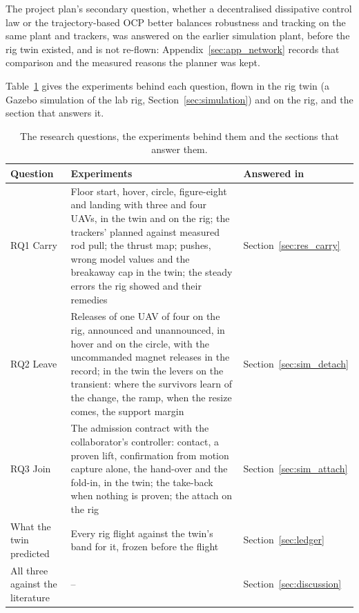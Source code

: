 The project plan's secondary question, whether a decentralised dissipative control law \cite{quan2025swarm} or
the trajectory-based OCP \cite{tudelft} better balances robustness and tracking on the same plant and
trackers, was answered on the earlier simulation plant, before the rig twin existed, and is not re-flown:
Appendix~\ref{sec:app_network} records that comparison and the measured reasons the planner was kept.

Table~\ref{tab:rq_map} gives the experiments behind each question, flown in the rig twin (a Gazebo simulation
of the lab rig, Section~\ref{sec:simulation}) and on the rig, and the section that answers it.

\begin{table}[h]
\centering
\small
\caption{The research questions, the experiments behind them and the sections that answer them.}
\label{tab:rq_map}
\begin{tabularx}{\textwidth}{>{\raggedright\arraybackslash}p{2.6cm}>{\raggedright\arraybackslash}Xl}
\toprule
Question & Experiments & Answered in \\
\midrule
RQ1 Carry & Floor start, hover, circle, figure-eight and landing with three and four UAVs, in the twin and on
the rig; the trackers' planned against measured rod pull; the thrust map; pushes, wrong model values and the
breakaway cap in the twin; the steady errors the rig showed and their remedies & Section~\ref{sec:res_carry} \\
\addlinespace
RQ2 Leave & Releases of one UAV of four on the rig, announced and unannounced, in hover and on the circle,
with the uncommanded magnet releases in the record; in the twin the levers on the transient: where the
survivors learn of the change, the ramp, when the resize comes, the support margin & Section~\ref{sec:sim_detach} \\
\addlinespace
RQ3 Join & The admission contract with the collaborator's controller: contact, a proven lift, confirmation
from motion capture alone, the hand-over and the fold-in, in the twin; the take-back when nothing is proven;
the attach on the rig & Section~\ref{sec:sim_attach} \\
\addlinespace
What the twin predicted & Every rig flight against the twin's band for it, frozen before the flight &
Section~\ref{sec:ledger} \\
\addlinespace
All three against the literature & -- & Section~\ref{sec:discussion} \\
\bottomrule
\end{tabularx}
\end{table}

